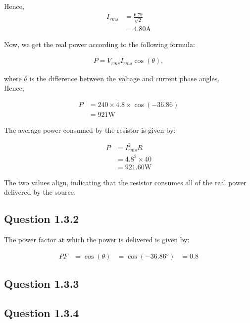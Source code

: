 \documentclass[paper=a4, fontsize=11pt]{scrartcl} %
\numberwithin{equation}{section} %
\numberwithin{figure}{section} %
\numberwithin{table}{section} %
\begin{document}
Hence,
\begin{align*}
I_{rms} &= \frac{6.79}{\sqrt{2}} \\
&= 4.80 \si{\ampere}
\end{align*}

Now, we get the real power according to the following formula:

\begin{align*}
P = V_{rms}I_{rms}\cos(\theta),
\end{align*}

where $\theta$ is the difference between the voltage and current phase angles. \\

Hence,

\begin{align*}
P &= 240 \times 4.8 \times \cos(-36.86) \\
&= 921 \si{\watt}
\end{align*}

The average power consumed by the resistor is given by:

\begin{align*}
P &= I_{rms}^2 R \\
&= 4.8^2 \times 40 \\
&= 921.60 \si{\watt}
\end{align*}

The two values align, indicating that the resistor consumes all of the real power delivered by the source.

\subsection*{Question 1.3.2}

The power factor at which the power is delivered is given by:

\begin{align*}
PF &= \cos(\theta)
&= \cos(-36.86\si{\degree})
&= 0.8
\end{align*}

\subsection*{Question 1.3.3}


\subsection*{Question 1.3.4}
\end{document}
